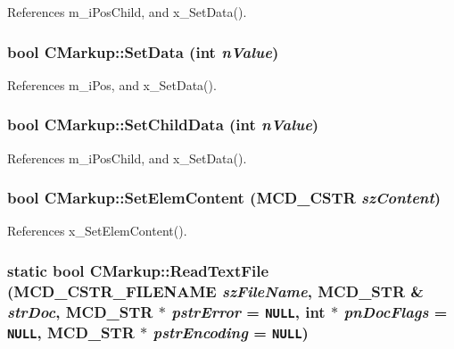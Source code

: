 References m\_\-iPosChild, and x\_\-SetData().
\subsubsection[SetData]{\setlength{\rightskip}{0pt plus 5cm}bool CMarkup::SetData (int {\em nValue})\hspace{0.3cm}{\tt  [inline]}}\label{classCMarkup_ce922c959d826b28f4ad2b279697238b}




References m\_\-iPos, and x\_\-SetData().
\subsubsection[SetChildData]{\setlength{\rightskip}{0pt plus 5cm}bool CMarkup::SetChildData (int {\em nValue})\hspace{0.3cm}{\tt  [inline]}}\label{classCMarkup_ffe236d0a43d1ac2502fef04b5d701c5}




References m\_\-iPosChild, and x\_\-SetData().
\subsubsection[SetElemContent]{\setlength{\rightskip}{0pt plus 5cm}bool CMarkup::SetElemContent ({\bf MCD\_\-CSTR} {\em szContent})\hspace{0.3cm}{\tt  [inline]}}\label{classCMarkup_9ee2b70e88102a9d98d54be9b6f27172}




References x\_\-SetElemContent().
\subsubsection[ReadTextFile]{\setlength{\rightskip}{0pt plus 5cm}static bool CMarkup::ReadTextFile (MCD\_\-CSTR\_\-FILENAME {\em szFileName}, \/  MCD\_\-STR \& {\em strDoc}, \/  MCD\_\-STR $\ast$ {\em pstrError} = {\tt NULL}, \/  int $\ast$ {\em pnDocFlags} = {\tt NULL}, \/  MCD\_\-STR $\ast$ {\em pstrEncoding} = {\tt NULL})\hspace{0.3cm}{\tt  [static]}}\label{classCMarkup_6d871eed98105bf74b09c3412d8e5b56}


